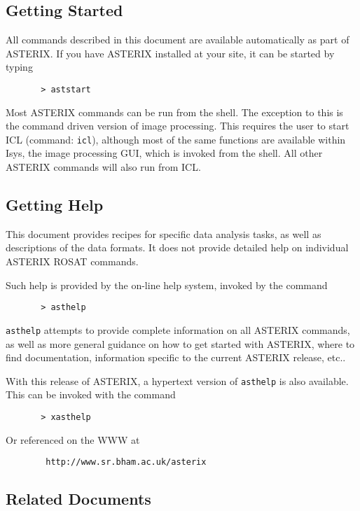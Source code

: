 \documentclass[11pt,fleqn]{article}    %
\begin{document}
\subsection{Getting Started}
All commands described in this document are available automatically as part 
of ASTERIX. If you have ASTERIX installed at your site, it can be started
by typing

\begin{verbatim}
       > aststart
\end{verbatim}

Most ASTERIX commands can be run from the shell.  The exception to this is
the command driven version of image processing.  This requires the
user to start ICL (command: {\tt icl}), although most of the same
functions are available within Isys, the image processing GUI, which
is invoked from the shell.  All other ASTERIX commands will also run
from ICL.

\subsection{Getting Help}
This document provides recipes for specific data analysis tasks, as well
as descriptions of the data formats. It does not provide detailed help on
individual ASTERIX ROSAT commands. 

Such help is provided by the on-line help system, invoked by the command

\begin{verbatim}
       > asthelp
\end{verbatim}

{\tt asthelp} attempts to provide complete information on all ASTERIX commands,
as well as more general guidance on how to get started with ASTERIX,
where to find documentation, information specific to the current ASTERIX
release, etc..

With this release of ASTERIX, a hypertext version of {\tt asthelp} is also
available. This can be invoked with the command 

\begin{verbatim}
       > xasthelp
\end{verbatim}

Or referenced on the WWW at 

\begin{verbatim}
        http://www.sr.bham.ac.uk/asterix
\end{verbatim}

\subsection{Related Documents}
\end{document}
